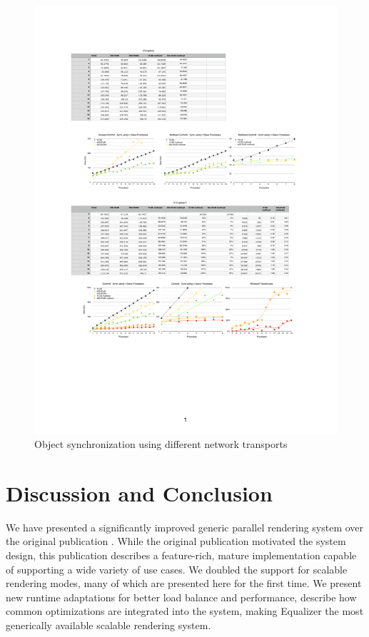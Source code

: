 \documentclass[10pt,journal,compsoc]{IEEEtran}
\begin{document}
\begin{figure}[p!]\center
  \includegraphics[height=.19\textheight]{images/ifdist}
  \caption{\label{fIFDist}Object synchronization using different network
    transports}
\end{figure}

\section{Discussion and Conclusion}
\label{sec:conclusions}

We have presented a significantly improved generic parallel rendering system
over the original publication \cite{EMP:09}. While the original publication
motivated the system design, this publication describes a feature-rich, mature
implementation capable of supporting a wide variety of use cases. We doubled the
support for scalable rendering modes, many of which are presented here for the
first time. We present new runtime adaptations for better load balance and
performance, describe how common optimizations are integrated into the system,
making Equalizer the most generically available scalable rendering system.
\end{document}

